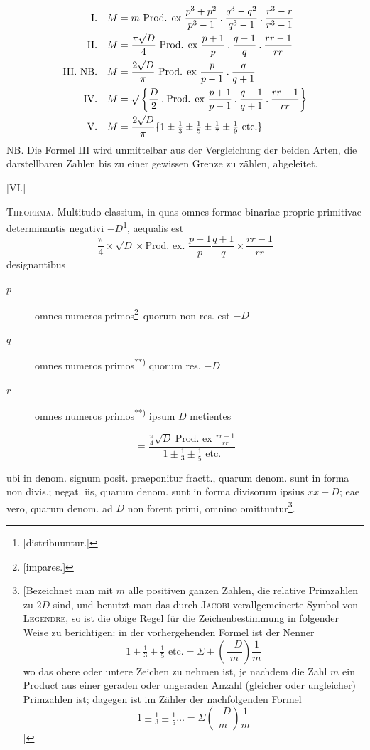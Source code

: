 %
\[
\begin{aligned}
\text{I.}\quad M&=m\ \text{Prod. ex }\frac{p^3+p^2}{p^3-1}\mathbin{.}\frac{q^3-q^2}{q^3-1}\mathbin{.}\frac{r^3-r}{r^3-1}\\
\text{II.}\quad M&=\frac{\pi\surd D}4\ \text{Prod. ex }\frac{p+1}p\mathbin{.}\frac{q-1}q\mathbin{.}\frac{rr-1}{rr}\\
\text{III. NB.}\quad M&=\frac{2\surd D}\pi\ \text{Prod. ex }\frac p{p-1}\mathbin{.}\frac q{q+1}\\
\text{IV.}\quad M&=\surd\left\{\frac D2\mathbin{.}\text{Prod. ex }\frac{p+1}{p-1}\mathbin{.}\frac{q-1}{q+1}\mathbin{.}\frac{rr-1}{rr}\right\}\\
\text{V.}\quad M&=\frac{2\surd D}\pi\{1\pm\tfrac13\pm\tfrac15\pm\tfrac17\pm\tfrac19\text{ etc.}\}
\end{aligned}
\]
NB. Die Formel III wird unmittelbar aus der Vergleichung der beiden Arten, die darstellbaren Zahlen bis zu einer gewissen Grenze zu zählen, abgeleitet.

\par\bigskip{}\centerline{[VI.]}\medskip
\textsc{Theorema.} Multitudo classium, in quas omnes formae binariae proprie primitivae determinantis negativi $-D$\begingroup\renewcommand{\thefootnote}{*)}\footnote{[distribuuntur.]}\endgroup, aequalis est
\[
\frac\pi4\times\surd D\times\text{Prod. ex. }\frac{p-1}p\frac{q+1}q\times\frac{rr-1}{rr}
\]
designantibus
\begin{description}
\item[$p$] omnes numeros primos\begingroup\renewcommand{\thefootnote}{**)}\footnote{[impares.]}\endgroup\ quorum non-res. est $-D$
\item[$q$] omnes numeros primos\textsuperscript{**)} quorum res. $-D$
\item[$r$] omnes numeros primos\textsuperscript{**)} ipsum $D$ metientes
\end{description}
\[
=\frac{\frac\pi4\surd D\ \text{Prod. ex }\frac{rr-1}{rr}}{1\pm\tfrac13\pm\tfrac15\text{ etc.}}
\]

ubi in denom. signum posit. praeponitur fractt., quarum denom. sunt in forma non divis.; negat. iis, quarum denom. sunt in forma divisorum ipsius $xx+D$; eae vero, quarum denom. ad $D$ non forent primi, omnino omittuntur\begingroup\renewcommand{\thefootnote}{***)}\footnote{[Bezeichnet man mit $m$ alle positiven ganzen Zahlen, die relative Primzahlen zu $2D$ sind, und benutzt man das durch \textsc{Jacobi} verallgemeinerte Symbol von \textsc{Legendre}, so ist die obige Regel für die Zeichenbestimmung in folgender Weise zu berichtigen: in der vorhergehenden Formel ist der Nenner
\[
1\pm\tfrac13\pm\tfrac15\text{ etc.}=\Sigma\pm\left(\frac{-D}m\right)\frac1m
\]
wo das obere oder untere Zeichen zu nehmen ist, je nachdem die Zahl $m$ ein Product aus einer geraden oder ungeraden Anzahl (gleicher oder ungleicher) Primzahlen ist; dagegen ist im Zähler der nachfolgenden Formel
\[
1\pm\tfrac13\pm\tfrac15\ldots=\Sigma\left(\frac{-D}m\right)\frac1m
\]
]}\endgroup.

